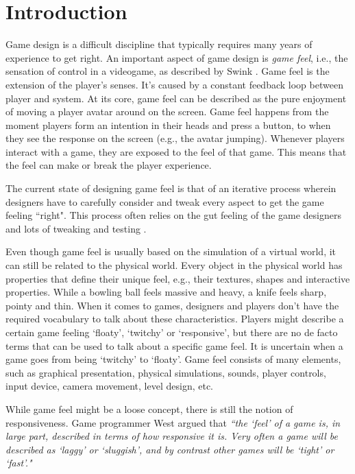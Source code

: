\section{Introduction}
Game design is a difficult discipline that typically requires many years of experience to get right. An important aspect of game design is \textit{game feel}, i.e., the sensation of control in a videogame, as described by Swink \cite{swink}. Game feel is the extension of the player's senses. It's caused by a constant feedback loop between player and system. At its core, game feel can be described as the pure enjoyment of moving a player avatar around on the screen. Game feel happens from the moment players form an intention in their heads and press a button, to when they see the response on the screen (e.g., the avatar jumping). Whenever players interact with a game, they are exposed to the feel of that game. This means that the feel can make or break the player experience.

The current state of designing game feel is that of an iterative process wherein designers have to carefully consider and tweak every aspect to get the game feeling ``right". This process often relies on the gut feeling of the game designers and lots of tweaking and testing \cite{meatboy1, juicyBeast, platformer_controls}.

Even though game feel is usually based on the simulation of a virtual world, it can still be related to the physical world. Every object in the physical world has properties that define their unique feel, e.g., their textures, shapes and interactive properties. While a bowling ball feels massive and heavy, a knife feels sharp, pointy and thin. When it comes to games, designers and players don't have the required vocabulary to talk about these characteristics. Players might describe a certain game feeling `floaty', `twitchy' or `responsive', but there are no de facto terms that can be used to talk about a specific game feel. It is uncertain when a game goes from being `twitchy' to `floaty'. Game feel consists of many elements, such as graphical presentation, physical simulations, sounds, player controls, input device, camera movement, level design, etc. 

While game feel might be a loose concept, there is still the notion of responsiveness. Game programmer West argued that \textit{``the `feel' of a game is, in large part, described in terms of how responsive it is. Very often a game will be described as `laggy' or `sluggish', and by contrast other games will be `tight' or `fast'."} \cite{measure_lag} 

